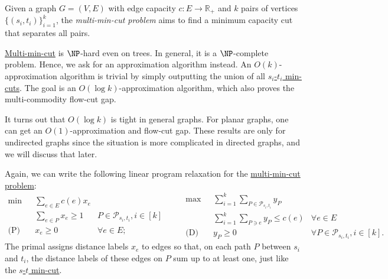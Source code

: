 \begin{problem}\label{prb:multi-min-cut}
Given a graph \(G = (V, E)\) with edge capacity \(c \colon E \to \mathbb{R} _+\) and \(k\) pairs of vertices \(\{ (s_i, t_i) \} _{i=1}^{k}\), the \emph{multi-min-cut problem} aims to find a minimum capacity cut that separates all pairs.
\end{problem}

\hyperref[prb:multi-min-cut]{Multi-min-cut} is \(\NP\)-hard even on trees. In general, it is a \(\NP\)-complete problem. Hence, we ask for an approximation algorithm instead. An \(O(k)\)-approximation algorithm is trivial by simply outputting the union of all \hyperref[prb:s-t-min-cut]{\(s_i\)-\(t_i\) min-cuts}. The goal is an \(O(\log k)\)-approximation algorithm, which also proves the multi-commodity flow-cut gap.

\begin{note}
	It turns out that \(O(\log k)\) is tight in general graphs. For planar graphs, one can get an \(O(1)\)-approximation and flow-cut gap. These results are only for undirected graphs since the situation is more complicated in directed graphs, and we will discuss that later.
\end{note}

Again, we can write the following linear program relaxation for the \hyperref[prb:multi-min-cut]{multi-min-cut problem}:
\begin{equation}\label{eq:multi-min-cut-LP}
	\begin{aligned}
		\min~           & \sum_{e \in E} c(e) x_e                                             \\
		                & \sum_{e \in P} x_e \geq 1 & P \in \mathcal{P}_{s_i, t_i}, i \in [k] \\
		\text{(P)}\quad & x_e \geq 0                & \forall e \in E;
	\end{aligned}\qquad
	\begin{aligned}
		\max~           & \sum_{i=1}^{k} \sum_{P \in \mathcal{P}_{s_i, t_i}} y_P                                                    \\
		                & \sum_{i=1}^{k} \sum_{P \ni e} y_P \leq c(e)            & \forall e \in E                                  \\
		\text{(D)}\quad & y_P \geq 0                                             & \forall P \in \mathcal{P}_{s_i, t_i}, i \in [k].
	\end{aligned}
\end{equation}
The primal assigns distance labels \(x_e\) to edges so that, on each path \(P\) between \(s_i\) and \(t_i\), the distance labels of these edges on \(P\) sum up to at least one, just like the \hyperref[prb:s-t-min-cut]{\(s\)-\(t\) min-cut}.

